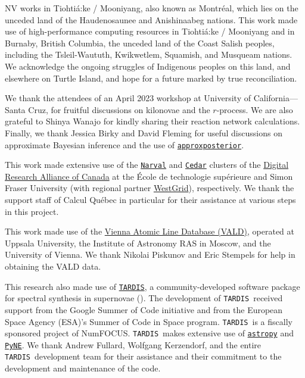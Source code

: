 \documentclass[twocolumn,twocolappendix]{aastex63}
\def\TARDIS{\texttt{TARDIS}}
\def\approxposterior{\texttt{approxposterior}}
\begin{document}
\acknowledgments


NV works in Tiohti{\'a}:ke / Mooniyang, also known as Montr{\'e}al, which lies on the unceded land of the Haudenosaunee and Anishinaabeg nations. This work made use of high-performance computing resources in Tiohti{\'a}:ke / Mooniyang and in Burnaby, British Columbia, the unceded land of the Coast Salish peoples, including the Tsleil-Waututh, Kwikwetlem, Squamish, and Musqueam nations. We acknowledge the ongoing struggles of Indigenous peoples on this land, and elsewhere on Turtle Island, and hope for a future marked by true reconciliation. 

We thank the attendees of an April 2023 workshop at University of California---Santa Cruz, for fruitful discussions on kilonovae and the $r$-process. We are also grateful to Shinya Wanajo for kindly sharing their reaction network calculations. Finally, we thank Jessica Birky and David Fleming for useful discussions on approximate Bayesian inference and the use of \href{https://dflemin3.github.io/approxposterior/index.html}{\approxposterior}.

This work made extensive use of the \href{https://docs.alliancecan.ca/wiki/Narval/en}{\texttt{Narval}} and \href{https://docs.alliancecan.ca/wiki/Cedar}{\texttt{Cedar}} clusters of the \href{https://alliancecan.ca/en}{Digital Research Alliance of Canada} at the {\'E}cole de technologie sup{\'e}rieure and Simon Fraser University (with regional partner \href{https://www.westgrid.ca/}{WestGrid}), respectively. We thank the support staff of Calcul Qu{\'e}bec in particular for their assistance at various steps in this project. 

This work made use of the \href{http://vald.astro.uu.se/~vald/php/vald.php}{Vienna Atomic Line Database (VALD)}, operated at Uppsala University, the Institute of Astronomy RAS in Moscow, and the University of Vienna. We thank Nikolai Piskunov and Eric Stempels for help in obtaining the VALD data.

This research also made use of \href{https://tardis-sn.github.io/tardis/index.html}{\TARDIS}, a community-developed software package for spectral synthesis in supernovae (\citealt{kerzendorf14}). The development of \TARDIS~received support from the Google Summer of Code initiative and from the European Space Agency (ESA)'s Summer of Code in Space program. \TARDIS~is a fiscally
sponsored project of NumFOCUS. \TARDIS~makes extensive use of \href{https://docs.astropy.org/en/stable/}{\texttt{astropy}} and \href{https://pyne.io/}{\texttt{PyNE}}. We thank Andrew Fullard, Wolfgang Kerzendorf, and the entire \TARDIS~development team for their assistance and their commitment to the development and maintenance of the code. 
\end{document}
